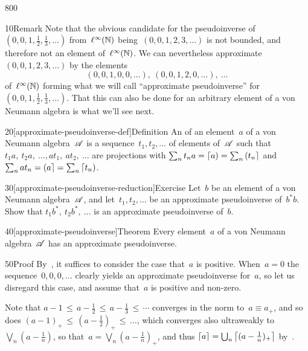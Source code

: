\begin{parsec}{800}%
\begin{point}{10}{Remark}%
Note that the obvious candidate
for the pseudoinverse of~$(0,0,1,\frac{1}{2},\frac{1}{3},\dotsc)$
    from~$\ell^\infty(\mathbb{N})$
being~$(0,0,1,2,3,\dotsc)$
is not bounded,
    and therefore not an element of~$\ell^\infty(\mathbb{N})$.
We can nevertheless approximate~$(0,0,1,2,3,\dotsc)$
by the elements
\begin{equation*}
(0,0,1,0,0,\dotsc),\ 
(0,0,1,2,0,\dotsc),\  \dots 
\end{equation*}
    of~$\ell^\infty(\mathbb{N})$
forming what we will call ``approximate pseudoinverse'' for 
$(0,0,1,\frac{1}{2},\frac{1}{3},\dotsc)$.
That this can also be done for an arbitrary element
of a von Neumann algebra
is what we'll see next.
\end{point}
\begin{point}{20}[approximate-pseudoinverse-def]{Definition}%
An %
%
of an element~$a$ of a von Neumann algebra~$\mathscr{A}$
is a sequence~$t_1,t_2,\dotsc$
of elements of~$\mathscr{A}$
such that~$t_1a,\ t_2a,\ \dotsc, at_1,\ at_2,\ \dotsc$
are projections with $\sum_n t_na = \left\lceil a\right)=\sum_n \left(t_n\right\rceil$
and~$\sum_n at_n =\left(a\right\rceil=\sum_n \left\lceil t_n\right)$.
\end{point}
\begin{point}{30}[approximate-pseudoinverse-reduction]{Exercise}%
Let~$b$ be an element of a von Neumann algebra~$\mathscr{A}$,
and let~$t_1,t_2,\dotsc$
be an approximate pseudoinverse
of~$b^*b$.
Show that $t_1b^*,\ t_2b^*,\ \dotsc$
is an approximate pseudoinverse of~$b$.
\end{point}
\begin{point}{40}[approximate-pseudoinverse]{Theorem}%
Every element~$a$ of a von Neumann algebra~$\mathscr{A}$
has an approximate pseudoinverse.
\begin{point}{50}{Proof}%
By~,
it suffices to consider the case that~$a$ is positive.
When~$a=0$ the sequence~$0,0,0,\dotsc$
clearly yields an approximate pseudoinverse for~$a$,
so let us disregard this case,
and assume that~$a$ is positive and non-zero.

Note that $a-1 \,\leq\, a-\frac{1}{2}\,\leq\, a - \frac{1}{3}\,\leq\, \dotsb$
converges in the norm to~$a\equiv a_+$,
and so does $(a-1)_+\,\leq\,(a-\frac{1}{2})_+\,\leq\,\dotsc$,
which converges also ultraweakly to~$\bigvee_n(a-\frac{1}{n})$,
so that~$a=\bigvee_n (a-\frac{1}{n})_+$,
and thus $\left\lceil a\right\rceil=\bigcup_n \left\lceil(a-\frac{1}{n})_+\right\rceil$
by~.


\end{point}
\end{point}
\end{parsec}

